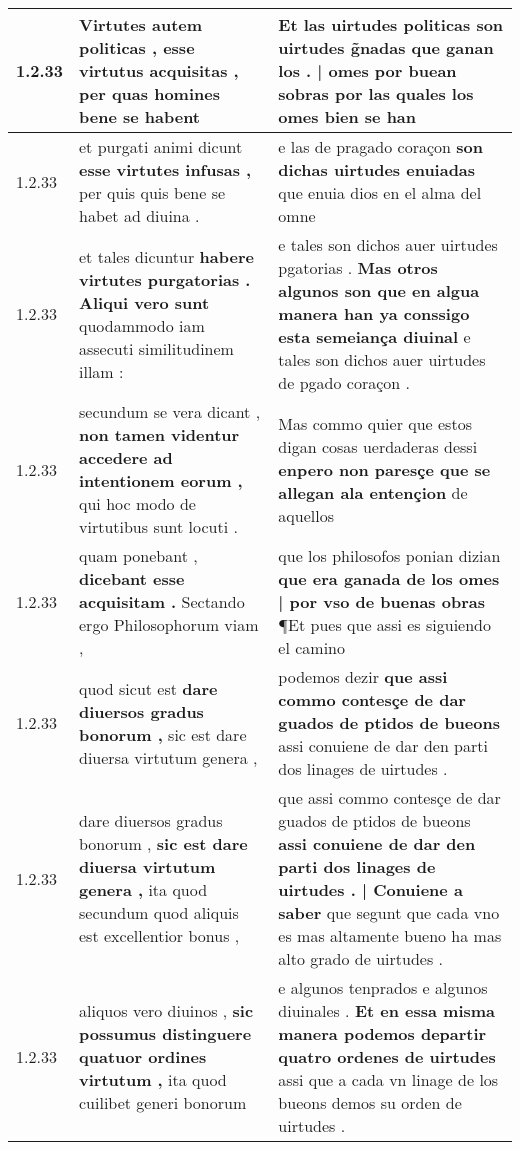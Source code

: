 \begin{tabular}{|p{1cm}|p{6.5cm}|p{6.5cm}|}
1.2.33 & Virtutes autem politicas , \textbf{ esse virtutus acquisitas , } per quas homines bene se habent & Et las uirtudes politicas son uirtudes g̃nadas \textbf{ que ganan los . | omes por buean sobras } por las quales los omes bien se han \\\hline
1.2.33 & et purgati animi dicunt \textbf{ esse virtutes infusas , } per quis quis bene se habet ad diuina . & e las de pragado coraçon \textbf{ son dichas uirtudes enuiadas } que enuia dios en el alma del omne \\\hline
1.2.33 & et tales dicuntur \textbf{ habere virtutes purgatorias . Aliqui vero sunt } quodammodo iam assecuti similitudinem illam : & e tales son dichos auer uirtudes pgatorias . \textbf{ Mas otros algunos son que en algua manera han ya conssigo esta semeiança diuinal } e tales son dichos auer uirtudes de pgado coraçon . \\\hline
1.2.33 & secundum se vera dicant , \textbf{ non tamen videntur accedere ad intentionem eorum , } qui hoc modo de virtutibus sunt locuti . & Mas commo quier que estos digan cosas uerdaderas dessi \textbf{ enpero non paresçe que se allegan ala entençion } de aquellos \\\hline
1.2.33 & quam ponebant , \textbf{ dicebant esse acquisitam . } Sectando ergo Philosophorum viam , & que los philosofos ponian dizian \textbf{ que era ganada de los omes | por vso de buenas obras } ¶Et pues que assi es siguiendo el camino \\\hline
1.2.33 & quod sicut est \textbf{ dare diuersos gradus bonorum , } sic est dare diuersa virtutum genera , & podemos dezir \textbf{ que assi commo contesçe de dar guados de ptidos de bueons } assi conuiene de dar den parti dos linages de uirtudes . \\\hline
1.2.33 & dare diuersos gradus bonorum , \textbf{ sic est dare diuersa virtutum genera , } ita quod secundum quod aliquis est excellentior bonus , & que assi commo contesçe de dar guados de ptidos de bueons \textbf{ assi conuiene de dar den parti dos linages de uirtudes . | Conuiene a saber } que segunt que cada vno es mas altamente bueno ha mas alto grado de uirtudes . \\\hline
1.2.33 & aliquos vero diuinos , \textbf{ sic possumus distinguere quatuor ordines virtutum , } ita quod cuilibet generi bonorum & e algunos tenprados e algunos diuinales . \textbf{ Et en essa misma manera podemos departir quatro ordenes de uirtudes } assi que a cada vn linage de los bueons demos su orden de uirtudes . \\\hline

\end{tabular}

